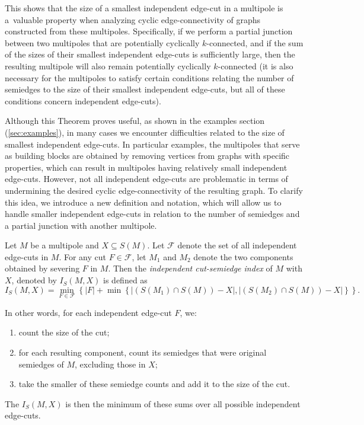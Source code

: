 \documentclass[12pt, twoside]{book}
\begin{document}
This shows that the size of a smallest independent edge-cut in a multipole is a~valuable property when analyzing cyclic edge-connectivity of graphs constructed from these multipoles. Specifically, if we perform a partial junction between two multipoles that are potentially cyclically $k$-connected, and if the sum of the sizes of their smallest independent edge-cuts is sufficiently large, then the resulting multipole will also remain potentially cyclically $k$-connected (it is also necessary for the multipoles to satisfy certain conditions relating the number of semiedges to the size of their smallest independent edge-cuts, but all of these conditions concern independent edge-cuts).

Although this Theorem proves useful, as shown in the examples section (\cref{sec:examples}), in many cases we encounter difficulties related to the size of smallest independent edge-cuts. In particular examples, the multipoles that serve as building blocks are obtained by removing vertices from graphs with specific properties, which can result in multipoles having relatively small independent edge-cuts. However, not all independent edge-cuts are problematic in terms of undermining the desired cyclic edge-connectivity of the resulting graph. To clarify this idea, we introduce a new definition and notation, which will allow us to handle smaller independent edge-cuts in relation to the number of semiedges and a partial junction with another multipole.

\begin{definition}
	Let $M$ be a multipole and $X\subseteq S(M)$.  Let $\mathcal{F}$ denote the set of all independent edge-cuts in $M$. For any cut $F\in\mathcal{F}$, let $M_1$ and $M_2$ denote the two components obtained by severing $F$ in $M$. Then the \textit{independent cut-semiedge index} of $M$ with $X$, denoted by $I_S(M, X)$ is defined as
	$$I_S(M, X)=\min\limits_{F\in\mathcal{F}} \left\{|F|+\min\left\{\left|\left(S(M_1)\cap S(M)\right)-X\right|, \left|\left(S(M_2)\cap S(M)\right)-X\right|\right\}\right\}.$$
\end{definition}

In other words, for each independent edge-cut $F$, we:
\begin{enumerate}
	\item count the size of the cut;
	\item for each resulting component, count its semiedges that were original semiedges of $M$, excluding those in $X$;
	\item take the smaller of these semiedge counts and add it to the size of the cut.
\end{enumerate}
The $I_S(M, X)$ is then the minimum of these sums over all possible independent edge-cuts.
\end{document}
